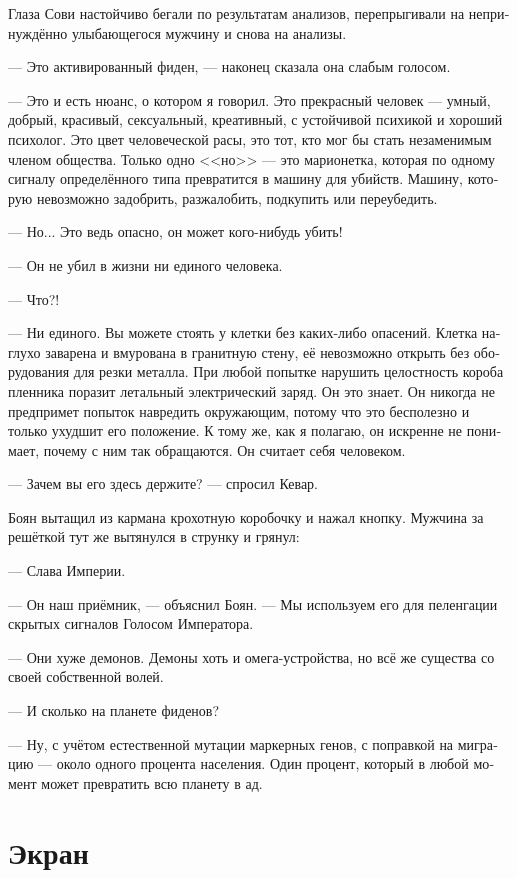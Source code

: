 \documentclass[a4paper,12pt,fleqn]{book}\usepackage{polyglossia}\setdefaultlanguage[babelshorthands=true]{russian}\setotherlanguage{english}\defaultfontfeatures{Ligatures=TeX,Mapping=tex-text}
\newcommand{\asterism}{\vspace{1em}{\centering\Large\bfseries$\ast~\ast~\ast$\par}\vspace{1em}}
\begin{document}
Глаза Сови настойчиво бегали по результатам анализов, перепрыгивали на непринуждённо улыбающегося мужчину и снова на анализы.

--- Это активированный фиден, --- наконец сказала она слабым голосом.

--- Это и есть нюанс, о котором я говорил.
Это прекрасный человек --- умный, добрый, красивый, сексуальный, креативный, с устойчивой психикой и хороший психолог.
Это цвет человеческой расы, это тот, кто мог бы стать незаменимым членом общества.
Только одно <<но>> --- это марионетка, которая по одному сигналу определённого типа превратится в машину для убийств.
Машину, которую невозможно задобрить, разжалобить, подкупить или переубедить.

--- Но...
Это ведь опасно, он может кого-нибудь убить!

--- Он не убил в жизни ни единого человека.

--- Что?!

--- Ни единого.
Вы можете стоять у клетки без каких-либо опасений.
Клетка наглухо заварена и вмурована в гранитную стену, её невозможно открыть без оборудования для резки металла.
При любой попытке нарушить целостность короба пленника поразит летальный электрический заряд.
Он это знает.
Он никогда не предпримет попыток навредить окружающим, потому что это бесполезно и только ухудшит его положение.
К тому же, как я полагаю, он искренне не понимает, почему с ним так обращаются.
Он считает себя человеком.

--- Зачем вы его здесь держите? --- спросил Кевар.

Боян вытащил из кармана крохотную коробочку и нажал кнопку.
Мужчина за решёткой тут же вытянулся в струнку и грянул:

--- Слава Империи.

--- Он наш приёмник, --- объяснил Боян.
--- Мы используем его для пеленгации скрытых сигналов Голосом Императора.

\asterism

--- Они хуже демонов.
Демоны хоть и омега-устройства, но всё же существа со своей собственной волей.

--- И сколько на планете фиденов?

--- Ну, с учётом естественной мутации маркерных генов, с поправкой на миграцию --- около одного процента населения.
Один процент, который в любой момент может превратить всю планету в ад.

\section{Экран}
\end{document}
